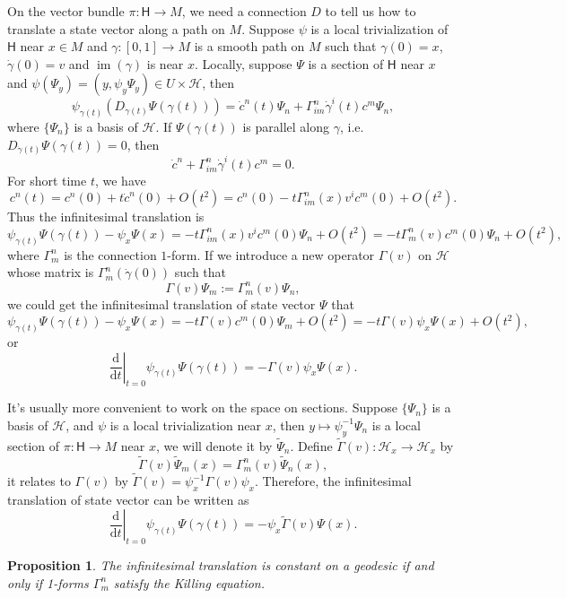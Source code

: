 \documentclass[12pt]{article}
\theoremstyle{definition}
\theoremstyle{plain}
\newtheorem{pro}[para]{Proposition}
\begin{document}
On the vector bundle $\pi:\mathsf H\to M$, we need a connection $D$ to tell us how to translate a state vector along a path on $M$. Suppose $\psi$ is a local trivialization of $\mathsf H$ near $x\in M$ and $\gamma:[0,1]\to M$ is a smooth path on $M$ such that $\gamma(0)=x$, $\dot\gamma(0)=v$ and $\operatorname{im}(\gamma)$ is near $x$. Locally, suppose $\Psi$ is a section of $\mathsf H$ near $x$ and $\psi(\Psi_y)=(y,\psi_y\Psi_y)\in U\times \mathcal H$, then
\[
	\psi_{\gamma(t)}\left(D_{\dot\gamma(t)}\Psi(\gamma(t))\right)=\dot c^n(t)\Psi_n+\Gamma_{im}^n\dot\gamma^i(t)c^m\Psi_n,
\]
where $\{\Psi_n\}$ is a basis of $\mathcal H$. If $\Psi(\gamma(t))$ is parallel along $\gamma$, i.e. $D_{\dot\gamma(t)}\Psi(\gamma(t))=0$, then
\[
	\dot c^n+\Gamma_{im}^n\dot\gamma^i(t)c^m=0.
\]
For short time $t$, we have
\[
	c^n(t)=c^n(0)+t\dot c^n(0)+O(t^2)=c^n(0)-t\Gamma_{im}^n(x)v^i c^m(0)+O(t^2).
\]
Thus the infinitesimal translation is
\[
	\psi_{\gamma(t)}\Psi(\gamma(t))-\psi_{x}\Psi(x)=-t\Gamma_{im}^n(x)v^i c^m(0)\Psi_n+O(t^2)=-t\Gamma_{m}^n(v)c^m(0)\Psi_n+O(t^2),
\]
where $\Gamma^n_m$ is the connection $1$-form. If we introduce a new operator $\Gamma(v)$ on $\mathcal H$ whose matrix is $\Gamma_{m}^n(\dot\gamma(0))$ such that
\[
	\Gamma(v)\Psi_m:=\Gamma_{m}^n(v)\Psi_n,
\]
we could get the infinitesimal translation of state vector $\Psi$ that
\[
	\psi_{\gamma(t)}\Psi(\gamma(t))-\psi_{x}\Psi(x)=-t\Gamma(v)c^m(0)\Psi_m+O(t^2)=-t\Gamma(v) \psi_{x}\Psi(x)+O(t^2),
\]
or
\[
	\left. \frac{\mathrm d}{\mathrm dt}\right|_{t=0}\psi_{\gamma(t)}\Psi(\gamma(t))=-\Gamma(v) \psi_{x}\Psi(x).
\]

It's usually more convenient to work on the space on sections. Suppose $\{\Psi_n\}$ is a basis of $\mathcal H$, and $\psi$ is a local trivialization near $x$, then $y\mapsto \psi_y^{-1}\Psi_n$ is a local section of $\pi:\mathsf H\to M$ near $x$, we will denote it by $\widetilde \Psi_n$. Define $\widetilde\Gamma(v):\mathcal H_x\to \mathcal H_x$ by
\[
	\widetilde\Gamma(v)\widetilde \Psi_m(x)=\Gamma^n_m(v)\widetilde \Psi_n(x),
\]
it relates to $\Gamma(v)$ by $\widetilde\Gamma(v)=\psi_x^{-1}\Gamma(v)\psi_x$. Therefore, the infinitesimal translation of state vector can be written as
\[
	\left. \frac{\mathrm d}{\mathrm dt}\right|_{t=0}\psi_{\gamma(t)}\Psi(\gamma(t))=- \psi_{x}\widetilde\Gamma(v)\Psi(x).
\]

\begin{pro}\label{pro:1}
	The infinitesimal translation is constant on a geodesic if and only if 1-forms $\Gamma^n_m$ satisfy the Killing equation.
\end{pro}
\end{document}
